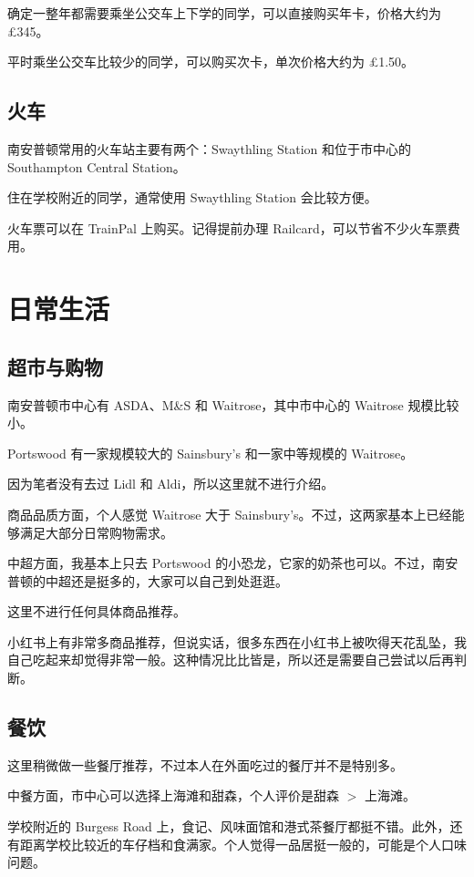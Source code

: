 \documentclass[UTF8,12pt,a4paper]{ctexart}
\begin{document}
确定一整年都需要乘坐公交车上下学的同学，可以直接购买年卡，价格大约为 \pounds{}345。

平时乘坐公交车比较少的同学，可以购买次卡，单次价格大约为 \pounds{}1.50。

\subsection{火车}

南安普顿常用的火车站主要有两个：Swaythling Station 和位于市中心的 Southampton Central Station。

住在学校附近的同学，通常使用 Swaythling Station 会比较方便。

火车票可以在 TrainPal 上购买。记得提前办理 Railcard，可以节省不少火车票费用。

\section{日常生活}

\subsection{超市与购物}

南安普顿市中心有 ASDA、M\&S 和 Waitrose，其中市中心的 Waitrose 规模比较小。

Portswood 有一家规模较大的 Sainsbury's 和一家中等规模的 Waitrose。

因为笔者没有去过 Lidl 和 Aldi，所以这里就不进行介绍。

商品品质方面，个人感觉 Waitrose 大于 Sainsbury's。不过，这两家基本上已经能够满足大部分日常购物需求。

中超方面，我基本上只去 Portswood 的小恐龙，它家的奶茶也可以。不过，南安普顿的中超还是挺多的，大家可以自己到处逛逛。

这里不进行任何具体商品推荐。

小红书上有非常多商品推荐，但说实话，很多东西在小红书上被吹得天花乱坠，我自己吃起来却觉得非常一般。这种情况比比皆是，所以还是需要自己尝试以后再判断。

\subsection{餐饮}

这里稍微做一些餐厅推荐，不过本人在外面吃过的餐厅并不是特别多。

中餐方面，市中心可以选择上海滩和甜森，个人评价是甜森 $>$ 上海滩。

学校附近的 Burgess Road 上，食记、风味面馆和港式茶餐厅都挺不错。此外，还有距离学校比较近的车仔档和食满家。个人觉得一品居挺一般的，可能是个人口味问题。
\end{document}
